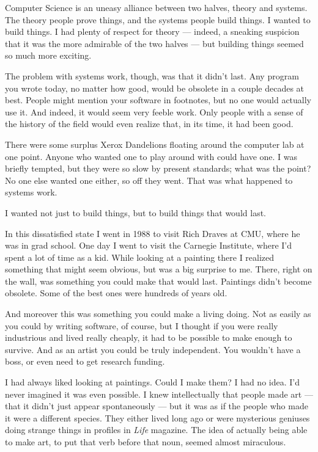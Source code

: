 \documentclass[12pt]{book}
\begin{document}
Computer Science is an uneasy alliance between two halves, theory and
systems. The theory people prove things, and the systems people build
things. I wanted to build things. I had plenty of respect for theory ---
indeed, a sneaking suspicion that it was the more admirable of the two
halves --- but building things seemed so much more exciting.

The problem with systems work, though, was that it didn't last. Any
program you wrote today, no matter how good, would be obsolete in a
couple decades at best. People might mention your software in footnotes,
but no one would actually use it. And indeed, it would seem very feeble
work. Only people with a sense of the history of the field would even
realize that, in its time, it had been good.

There were some surplus Xerox Dandelions floating around the computer
lab at one point. Anyone who wanted one to play around with could have
one. I was briefly tempted, but they were so slow by present standards;
what was the point? No one else wanted one either, so off they went.
That was what happened to systems work.

I wanted not just to build things, but to build things that would last.

In this dissatisfied state I went in 1988 to visit Rich Draves at CMU,
where he was in grad school. One day I went to visit the Carnegie
Institute, where I'd spent a lot of time as a kid. While looking at a
painting there I realized something that might seem obvious, but was a
big surprise to me. There, right on the wall, was something you could
make that would last. Paintings didn't become obsolete. Some of the best
ones were hundreds of years old.

And moreover this was something you could make a living doing. Not as
easily as you could by writing software, of course, but I thought if you
were really industrious and lived really cheaply, it had to be possible
to make enough to survive. And as an artist you could be truly
independent. You wouldn't have a boss, or even need to get research
funding.

I had always liked looking at paintings. Could I make them? I had no
idea. I'd never imagined it was even possible. I knew intellectually
that people made art --- that it didn't just appear spontaneously ---
but it was as if the people who made it were a different species. They
either lived long ago or were mysterious geniuses doing strange things
in profiles in \emph{Life} magazine. The idea of actually being able to
make art, to put that verb before that noun, seemed almost miraculous.
\end{document}
